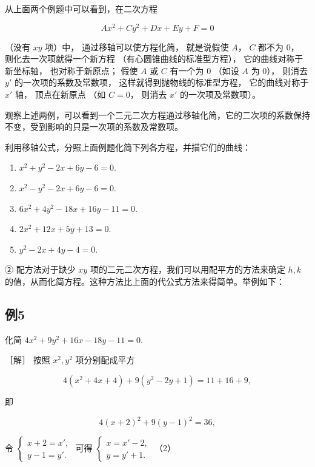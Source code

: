 从上面两个例题中可以看到，在二次方程

\[
A x^{2} + C y^{2} + D x + E y + F = 0
\]

（没有 \(xy\) 项）中， 通过移轴可以使方程化简， 就是说假使 \(A\)， \(C\)
都不为 0， 则化去一次项就得一个新方程 （有心圆锥曲线的标准型方程），
它的曲线对称于新坐标轴， 也对称于新原点； 假使 \(A\) 或 \(C\) 有一个为 0
（如设 \(A\) 为 0）， 则消去 \(y'\) 的一次项的系数及常数项，
这样就得到抛物线的标准型方程， 它的曲线对称于 \(x'\) 轴， 顶点在新原点
（如 \(C = 0\)， 则消去 \(x'\) 的一次项及常数项）。

观察上述两例，可以看到一个二元二次方程通过移轴化简，它的二次项的系数保持不变，受到影响的只是一次项的系数及常数项。

利用移轴公式，分照上面例题化简下列各方程，并描它们的曲线：

\begin{enumerate}
\def\labelenumi{\arabic{enumi}.}
\item
  \(x^{2} + y^{2} - 2x + 6y - 6 = 0.\)
\item
  \(x^{2} - y^{2} - 2x + 6y - 6 = 0.\)
\item
  \(6x^{2} + 4y^{2} - 18x + 16y - 11 = 0.\)
\item
  \(2x^{2} + 12x + 5y + 13 = 0.\)
\item
  \(y^{2}-2x+4y-4=0.\)
\end{enumerate}

② 配方法对于缺少 \(xy\) 项的二元二次方程，我们可以用配平方的方法来确定
\(h, k\)
的值，从而化简方程。这种方法比上面的代公式方法来得简单。举例如下：

\subsection{例5}\label{ux4f8b5-9}

化简 \(4x^{2} + 9y^{2} + 16x - 18y - 11 = 0.\)

［解］ 按照 \(x^{2}, y^{2}\) 项分别配成平方

\[
4 (x^{2} + 4 x + 4) + 9 (y^{2} - 2 y + 1) = 11 + 16 + 9,
\]

即

\[
4 (x + 2) ^ {2} + 9 (y - 1) ^ {2} = 36, \tag {1}
\]

令
\(\left\{ \begin{array}{l} x + 2 = x', \\ y - 1 = y'. \end{array} \right.\)
可得
\(\left\{ \begin{array}{l} x = x' - 2, \\ y = y' + 1. \end{array} \right.\)
（2）

